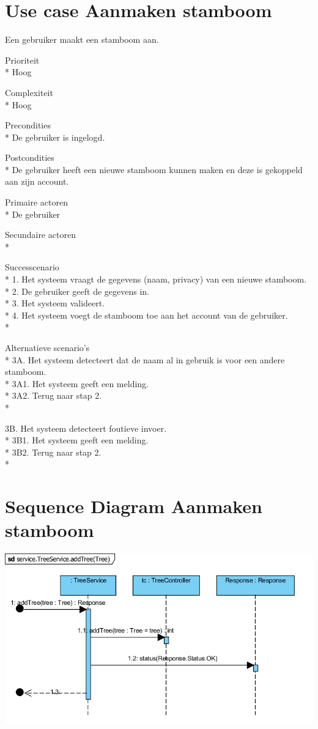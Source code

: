 \documentclass[pdftex,a4paper,12pt,twoside]{report}
\begin{document}
\section{Use case Aanmaken stamboom}
Een gebruiker maakt een stamboom aan.

Prioriteit\\*
Hoog

Complexiteit\\*
Hoog

Precondities \\*
De gebruiker is ingelogd.

Postcondities \\*
De gebruiker heeft een nieuwe stamboom kunnen maken en deze is gekoppeld aan zijn account.

Primaire actoren \\*
De gebruiker

Secundaire actoren \\*

Successcenario\\*
1. Het systeem vraagt de gegevens  (naam, privacy) van een nieuwe stamboom. \\*
2. De gebruiker geeft de gegevens in.\\*
3. Het systeem valideert.\\*
4. Het systeem voegt de stamboom toe aan het account van de gebruiker.\\*

Alternatieve scenario’s\\*
3A. Het systeem detecteert dat de naam al in gebruik is voor een andere stamboom.\\*
3A1. Het systeem geeft een melding.\\*
3A2. Terug naar stap 2.\\*

3B. Het systeem detecteert foutieve invoer.\\*
3B1. Het systeem geeft een melding.\\*
3B2. Terug naar stap 2.\\*

\section{Sequence Diagram Aanmaken stamboom}
\includegraphics[width=\textwidth]{images/aanmakentree.png}
\end{document}
